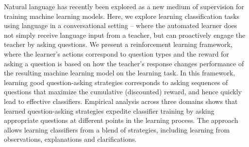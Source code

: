 Natural language has recently been explored as a new medium of supervision for training machine learning models. Here, we explore learning classification tasks using language in a conversational setting -- where the automated learner does not simply receive language input from a teacher, but can proactively engage the teacher by asking questions. We present a reinforcement learning framework, where the learner's actions correspond to question types and the reward for asking a question is based on how the teacher's response changes performance of the resulting machine learning model on the learning task. In this framework, learning good question-asking strategies corresponds to asking sequences of questions that maximize the cumulative (discounted) reward, and hence quickly lead to effective classifiers. Empirical analysis across three domains shows that learned question-asking strategies expedite classifier training by asking appropriate questions at different points in the learning process. The approach allows learning classifiers from a blend of strategies, including learning from observations, explanations and clarifications.